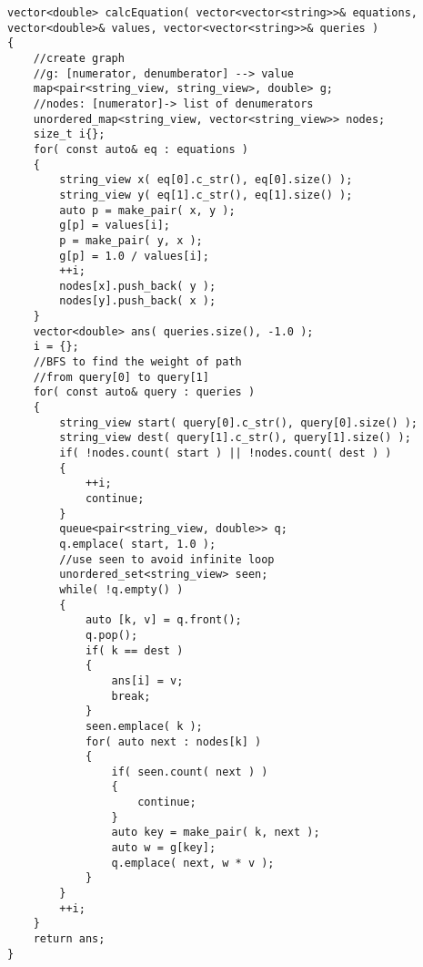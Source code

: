 \setcounter{lstlisting}{0}
\begin{lstlisting}[style=customc, caption={DFS}]
vector<double> calcEquation( vector<vector<string>>& equations, vector<double>& values, vector<vector<string>>& queries )
{
    //create graph
    //g: [numerator, denumberator] --> value
    map<pair<string_view, string_view>, double> g;
    //nodes: [numerator]-> list of denumerators
    unordered_map<string_view, vector<string_view>> nodes;
    size_t i{};
    for( const auto& eq : equations )
    {
        string_view x( eq[0].c_str(), eq[0].size() );
        string_view y( eq[1].c_str(), eq[1].size() );
        auto p = make_pair( x, y );
        g[p] = values[i];
        p = make_pair( y, x );
        g[p] = 1.0 / values[i];
        ++i;
        nodes[x].push_back( y );
        nodes[y].push_back( x );
    }
    vector<double> ans( queries.size(), -1.0 );
    i = {};
    //BFS to find the weight of path
    //from query[0] to query[1]
    for( const auto& query : queries )
    {
        string_view start( query[0].c_str(), query[0].size() );
        string_view dest( query[1].c_str(), query[1].size() );
        if( !nodes.count( start ) || !nodes.count( dest ) )
        {
            ++i;
            continue;
        }
        queue<pair<string_view, double>> q;
        q.emplace( start, 1.0 );
        //use seen to avoid infinite loop
        unordered_set<string_view> seen;
        while( !q.empty() )
        {
            auto [k, v] = q.front();
            q.pop();
            if( k == dest )
            {
                ans[i] = v;
                break;
            }
            seen.emplace( k );
            for( auto next : nodes[k] )
            {
                if( seen.count( next ) )
                {
                    continue;
                }
                auto key = make_pair( k, next );
                auto w = g[key];
                q.emplace( next, w * v );
            }
        }
        ++i;
    }
    return ans;
}
\end{lstlisting}